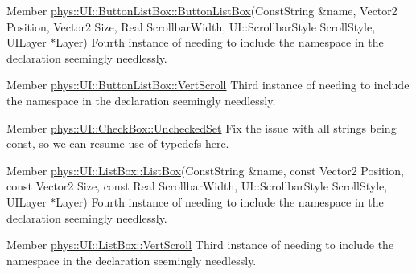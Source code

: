 \label{dd/da0/todo__todo000025}
\hypertarget{dd/da0/todo__todo000025}{}
 
\begin{DoxyDescription}
\item[Member \hyperlink{classphys_1_1UI_1_1ButtonListBox_a1360d155570a277a169b54a6c85ace0d}{phys::UI::ButtonListBox::ButtonListBox}(ConstString \&name, Vector2 Position, Vector2 Size, Real ScrollbarWidth, UI::ScrollbarStyle ScrollStyle, UILayer $\ast$Layer) ]Fourth instance of needing to include the namespace in the declaration seemingly needlessly. 
\end{DoxyDescription}

\label{dd/da0/todo__todo000026}
\hypertarget{dd/da0/todo__todo000026}{}
 
\begin{DoxyDescription}
\item[Member \hyperlink{classphys_1_1UI_1_1ButtonListBox_aa47d94d75c58e3408a97766eace2c20e}{phys::UI::ButtonListBox::VertScroll} ]Third instance of needing to include the namespace in the declaration seemingly needlessly. 
\end{DoxyDescription}

\label{dd/da0/todo__todo000027}
\hypertarget{dd/da0/todo__todo000027}{}
 
\begin{DoxyDescription}
\item[Member \hyperlink{classphys_1_1UI_1_1CheckBox_a7b670d93f119193283ec78b94f842429}{phys::UI::CheckBox::UncheckedSet} ]Fix the issue with all strings being const, so we can resume use of typedefs here. 
\end{DoxyDescription}

\label{dd/da0/todo__todo000028}
\hypertarget{dd/da0/todo__todo000028}{}
 
\begin{DoxyDescription}
\item[Member \hyperlink{classphys_1_1UI_1_1ListBox_a0bf957f875c9a7c5361c26b5001ce821}{phys::UI::ListBox::ListBox}(ConstString \&name, const Vector2 Position, const Vector2 Size, const Real ScrollbarWidth, UI::ScrollbarStyle ScrollStyle, UILayer $\ast$Layer) ]Fourth instance of needing to include the namespace in the declaration seemingly needlessly. 
\end{DoxyDescription}

\label{dd/da0/todo__todo000029}
\hypertarget{dd/da0/todo__todo000029}{}
 
\begin{DoxyDescription}
\item[Member \hyperlink{classphys_1_1UI_1_1ListBox_ab2b012b345ff4bb1a5b228fef88d895c}{phys::UI::ListBox::VertScroll} ]Third instance of needing to include the namespace in the declaration seemingly needlessly. 
\end{DoxyDescription}

